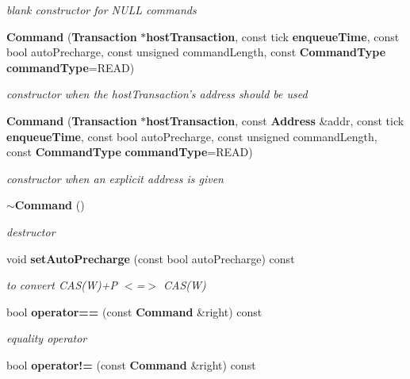 \begin{CompactItemize}
\begin{CompactItemize}
\begin{CompactList}\small\item\em blank constructor for NULL commands \item\end{CompactList}\item 
{\bf Command} ({\bf Transaction} $\ast${\bf hostTransaction}, const tick {\bf enqueueTime}, const bool autoPrecharge, const unsigned commandLength, const {\bf CommandType} {\bf commandType}=READ)\label{class_d_r_a_msim_i_i_1_1_command_8788e1ab0eff1a17e0576e45bb0f4993}

\begin{CompactList}\small\item\em constructor when the hostTransaction's address should be used \item\end{CompactList}\item 
{\bf Command} ({\bf Transaction} $\ast${\bf hostTransaction}, const {\bf Address} \&addr, const tick {\bf enqueueTime}, const bool autoPrecharge, const unsigned commandLength, const {\bf CommandType} {\bf commandType}=READ)\label{class_d_r_a_msim_i_i_1_1_command_b8f2039baa068748fa987ae897a9510f}

\begin{CompactList}\small\item\em constructor when an explicit address is given \item\end{CompactList}\item 
{\bf $\sim$Command} ()
\begin{CompactList}\small\item\em destructor \item\end{CompactList}\item 
void {\bf setAutoPrecharge} (const bool autoPrecharge) const 
\begin{CompactList}\small\item\em to convert CAS(W)+P $<$=$>$ CAS(W) \item\end{CompactList}\item 
bool {\bf operator==} (const {\bf Command} \&right) const \label{class_d_r_a_msim_i_i_1_1_command_7d846b35d3cfb89c4f6f24d1806b7977}

\begin{CompactList}\small\item\em equality operator \item\end{CompactList}\item 
bool {\bf operator!=} (const {\bf Command} \&right) const \label{class_d_r_a_msim_i_i_1_1_command_7680db3aeba3b242a5e45c6d1c7f3c49}


\end{CompactItemize}
\end{CompactItemize}

